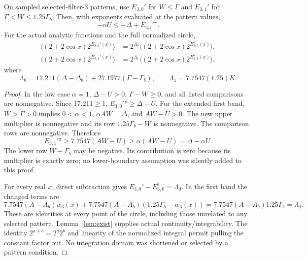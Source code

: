 \begin{theorem}\label{thm:boundary}
On sampled selected-filter-3 patterns, use $E_{3,0}'$ for
$W\le\Gamma$ and $E_{3,1}'$ for $\Gamma<W\le1.25\Gamma_b$.
Then, with exponents evaluated at the pattern values,
\[
 -\alpha U\le-\Delta+E_{3,i}'{}^{\pi}.
\]
For the actual analytic functions and the full normalized circle,
\begin{align*}
 \langle(2+2\cos x)2^{E_{3,0}'(x)}\rangle
   &=2^{\Lambda_0}\langle(2+2\cos x)2^{E_{3,0}^{b}(x)}\rangle,\\
 \langle(2+2\cos x)2^{E_{3,1}'(x)}\rangle
   &=2^{\Lambda_1}\langle(2+2\cos x)2^{E_{3,1}^{b}(x)}\rangle,
\end{align*}
where
\[
 \Lambda_0=17.211(\Delta-\Delta_b)+27.1977(\Gamma-\Gamma_b),
 \qquad \Lambda_1=7.7547(1.25)K.
\]
\end{theorem}
\begin{proof}
In the low case $\alpha=1$, $\Delta-U>0$, $\Gamma-W\ge0$,
and all listed comparisons are nonnegative. Since $17.211\ge1$,
$E_{3,0}'{}^\pi\ge\Delta-U$.
For the extended first band, $W>\Gamma>0$ implies $0<\alpha<1$,
$\alpha AW=\Delta$, and $AW-U>0$. The new upper multiplier is
nonnegative and its row $1.25\Gamma_b-W$ is nonnegative. The comparison
rows are nonnegative. Therefore
\[
 E_{3,1}'{}^\pi\ge7.7547(AW-U)\ge\alpha(AW-U)=\Delta-\alpha U.
\]
The lower row $W-\Gamma_b$ may be negative. Its contribution is zero
because its multiplier is exactly zero; no lower-boundary assumption
was silently added to this proof.

For every real $x$, direct subtraction gives
$E_{3,0}'-E_{3,0}^b=\Lambda_0$. In the first band the changed terms are
\[
 7.7547(A-A_b)w_3(x)
 +7.7547(A-A_b)(1.25\Gamma_b-w_3(x))
 =7.7547(A-A_b)1.25\Gamma_b=\Lambda_1.
\]
These are identities at every point of the circle, including those
unrelated to any selected pattern. Lemma~\ref{lem:exist} supplies actual
continuity/integrability. The identity $2^{a+b}=2^a2^b$ and linearity
of the normalized integral permit pulling the constant factor out.
No integration domain was shortened or selected by a pattern condition.
\end{proof}

